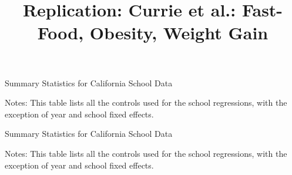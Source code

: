 \documentclass[11pt]{article}
\title{Replication: Currie et al.: Fast-Food, Obesity, Weight Gain}
\date{}							%
\begin{document}
\maketitle
\newpage
\begin{table}[H]
\caption{\label{fig: sum_stats} Summary Statistics for California School Data}
\vspace{-0.3cm}

\begin{center}\tiny


\end{center}
\vspace{-0.3cm}
\par
\begin{minipage}{ \linewidth}
\scriptsize{Notes: This table lists all the controls used for the school regressions, with the exception of year and school fixed
effects.}
\end{minipage}

\end{table}



\begin{table}[H]
\caption{\label{fig: sum_stats} Summary Statistics for California School Data}
\vspace{-0.3cm}

\begin{center}\small


\end{center}
\vspace{-0.3cm}
\par
\begin{minipage}{ \linewidth}
\scriptsize{Notes: This table lists all the controls used for the school regressions, with the exception of year and school fixed
effects.}
\end{minipage}

\end{table}
\end{document}
